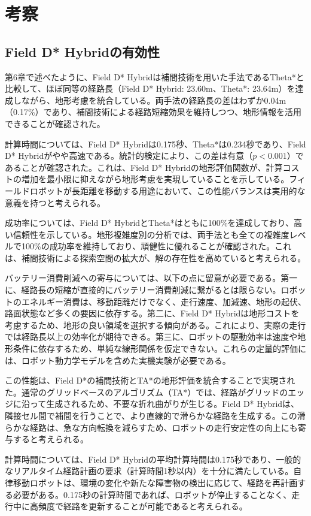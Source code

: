 \chapter{考察}

\section{Field D* Hybridの有効性}

第6章で述べたように、Field D* Hybridは補間技術を用いた手法であるTheta*と比較して、ほぼ同等の経路長（Field D* Hybrid: 23.60m、Theta*: 23.64m）を達成しながら、地形考慮を統合している。両手法の経路長の差はわずか0.04m（0.17\%）であり、補間技術による経路短縮効果を維持しつつ、地形情報を活用できることが確認された。

計算時間については、Field D* Hybridは0.175秒、Theta*は0.234秒であり、Field D* Hybridがやや高速である。統計的検定により、この差は有意（$p<0.001$）であることが確認された。これは、Field D* Hybridの地形評価関数が、計算コストの増加を最小限に抑えながら地形考慮を実現していることを示している。フィールドロボットが長距離を移動する用途において、この性能バランスは実用的な意義を持つと考えられる。

成功率については、Field D* HybridとTheta*はともに100\%を達成しており、高い信頼性を示している。地形複雑度別の分析では、両手法とも全ての複雑度レベルで100\%の成功率を維持しており、頑健性に優れることが確認された。これは、補間技術による探索空間の拡大が、解の存在性を高めていると考えられる。

バッテリー消費削減への寄与については、以下の点に留意が必要である。第一に、経路長の短縮が直接的にバッテリー消費削減に繋がるとは限らない。ロボットのエネルギー消費は、移動距離だけでなく、走行速度、加減速、地形の起伏、路面状態など多くの要因に依存する。第二に、Field D* Hybridは地形コストを考慮するため、地形の良い領域を選択する傾向がある。これにより、実際の走行では経路長以上の効率化が期待できる。第三に、ロボットの駆動効率は速度や地形条件に依存するため、単純な線形関係を仮定できない。これらの定量的評価には、ロボット動力学モデルを含めた実機実験が必要である。

この性能は、Field D*の補間技術とTA*の地形評価を統合することで実現された。通常のグリッドベースのアルゴリズム（TA*）では、経路がグリッドのエッジに沿って生成されるため、不要な折れ曲がりが生じる。Field D* Hybridは、隣接セル間で補間を行うことで、より直線的で滑らかな経路を生成する。この滑らかな経路は、急な方向転換を減らすため、ロボットの走行安定性の向上にも寄与すると考えられる。

計算時間については、Field D* Hybridの平均計算時間は0.175秒であり、一般的なリアルタイム経路計画の要求（計算時間1秒以内）を十分に満たしている。自律移動ロボットは、環境の変化や新たな障害物の検出に応じて、経路を再計画する必要がある。0.175秒の計算時間であれば、ロボットが停止することなく、走行中に高頻度で経路を更新することが可能であると考えられる。

